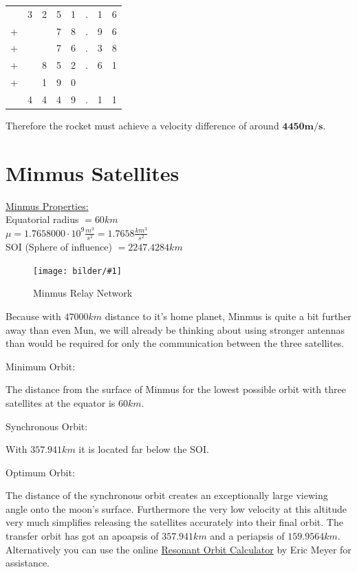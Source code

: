 \documentclass[12pt,paper=A4,numbers=noenddot,bibliography=totoc,listof=totoc,DIV=11,BCOR=1mm]{scrreprt}
\newcommand{\bildscaled}[4]{%
	\begin{figure}[htbp]
	\begin{center}
	\texttt{[image: bilder/\#1]}
	\caption{#3}\label{#2}
	\end{center}
	\end{figure}
}
\begin{document}
\begin{flushright}
\begin{tabular}{c@{\,}c@{\,}c@{\,}c@{\,}c@{\,}c@{\,}c@{\,}c}
  & 3 & 2 & 5 & 1 & . & 1 & 6 \\ 
+ &   &   & 7 & 8 & . & 9 & 6 \\ 
+ &   &   & 7 & 6 & . & 3 & 8 \\ 
+ &   & 8 & 5 & 2 & . & 6 & 1 \\ 
+ &   & 1 & 9 & 0 &   &   &   \\ 
\hline 
  & 4 & 4 & 4 & 9 & . & 1 & 1 \\ 
\end{tabular}
\end{flushright}

\begin{flushleft}
Therefore the rocket must achieve a velocity difference of around $\mathbf{4450m/s}$.
\end{flushleft}



\chapter{Minmus Satellites}
\begin{flushright}
\href{https://wiki.kerbalspaceprogram.com/wiki/Minmus}{Minmus Properties:} \\
Equatorial radius $ = 60km$ \\
$\mu = 1.7658000 \cdot 10^{9} \frac{m^{3}}{s^{2}} = 1.7658 \frac{km^{3}}{s^{2}}$ \\
SOI (Sphere of influence) $ = 2247.4284 km$
\end{flushright}
\bildscaled{Minmus}{minmus}{Minmus Relay Network}{0.5}

Because with $47000km$ distance to it's home planet, Minmus is quite a bit further away than even Mun, we will already be thinking about using stronger antennas than would be required for only the communication between the three satellites.

\begin{flushleft}
Minimum Orbit:
\end{flushleft}
The distance from the surface of Minmus for the lowest possible orbit with three satellites at the equator is $60km$.

\begin{flushleft}
Synchronous Orbit:
\end{flushleft}
With $357.941 km$ it is located far below the SOI.

\begin{flushleft}
Optimum Orbit:
\end{flushleft}
The distance of the synchronous orbit creates an exceptionally large viewing angle onto the moon's surface.
Furthermore the very low velocity at this altitude very much simplifies releasing the satellites accurately into their final orbit. The transfer orbit has got an apoapsis of $357.941km$ and a periapsis of $159.9564km$. Alternatively you can use the online \href{https://meyerweb.com/eric/ksp/resonant-orbits/}{Resonant Orbit Calculator} by Eric Meyer for assistance.
\end{document}
